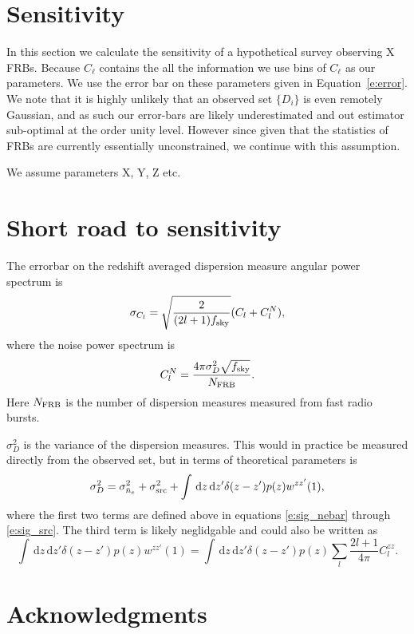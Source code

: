 \documentclass[onecolumn,prd,noshowpacs,nofootinbib,amsmath,amssymb]{revtex4}
\newcommand{\ud}{\,\mathrm{d}}
\newcommand{\red}{}
\begin{document}
\section{Sensitivity}

In this section we calculate the sensitivity of a hypothetical survey observing
X FRBs. Because $C_\ell$ contains the all the information we use bins
of $C_\ell$ as our parameters. We use the error bar on these parameters given
in Equation~\ref{e:error}.  We note that it is highly unlikely that an observed
set $\{D_i\}$ is even remotely Gaussian, and as such our error-bars are likely
underestimated and out estimator sub-optimal at the order unity level. 
However since given that the statistics of FRBs are currently essentially
unconstrained, we continue with this assumption.

We assume parameters X, Y, Z etc.

\section{Short road to sensitivity}

The errorbar on the redshift averaged dispersion measure angular power spectrum
is
\begin{equation}
    \sigma_{C_l} = \sqrt{\frac{2}{(2 l + 1) f_{\rm sky}}} (C_l + C^N_l),
\end{equation}
where the noise power spectrum is
\begin{equation}
    C^N_l = \frac{4 \pi \sigma_D^2 \sqrt{f_{\rm sky}}}{N_{\rm FRB}}.
\end{equation}
Here $N_{\rm FRB}$ is the number of dispersion measures measured from fast
radio bursts.

$\sigma_D^2$ is the variance of the dispersion measures.  This would in
practice be measured directly from the observed set, but in terms of
theoretical parameters is
\begin{equation}
\sigma_D^2 = \sigma_{\bar{n}_e}^2 + \sigma^2_{\rm src} + \int \ud z \ud z'
\delta(z - z') p(z) w^{z z'}(1),
\end{equation}
where the first two terms are defined above in equations \ref{e:sig_nebar}
through
\ref{e:sig_src}. The third term is likely
neglidgable and could also be written as
\begin{equation}
    \int \ud z \ud z' \delta(z - z') p(z) w^{z z'}(1) = \int \ud z \ud z'
    \delta(z - z') p(z) \sum_{l} \frac{2l+1}{4\pi} C_l^{zz}.
\end{equation}



\bigskip
\section*{Acknowledgments}
\medskip

 


\end{document}
